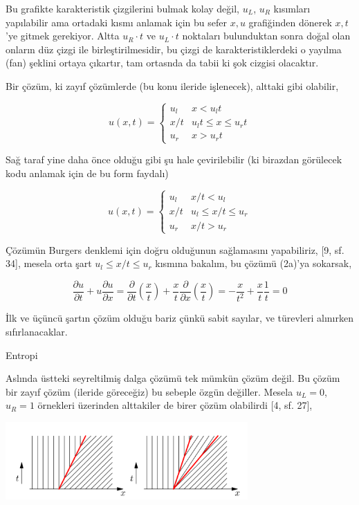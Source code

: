 \documentclass[12pt,fleqn]{article}\usepackage{../../common}
\begin{document}
Bu grafikte karakteristik çizgilerini bulmak kolay değil, $u_L$, $u_R$ kısımları
yapılabilir ama ortadaki kısmı anlamak için bu sefer $x,u$ grafiğinden dönerek
$x,t$'ye gitmek gerekiyor. Altta $u_R \cdot t$ ve $u_L \cdot t$ noktaları
bulunduktan sonra doğal olan onların düz çizgi ile birleştirilmesidir, bu çizgi
de karakteristiklerdeki o yayılma (fan) şeklini ortaya çıkartır, tam ortasnda da
tabii ki şok cizgisi olacaktır. 

Bir çözüm, ki zayıf çözümlerde (bu konu ileride işlenecek), alttaki gibi olabilir,

$$
u(x,t) =
\left\{ \begin{array}{ll}
u_l & x < u_l t  \\
x/t & u_l t \le x \le u_r t \\
u_r & x > u_r t
\end{array} \right.
$$

Sağ taraf yine daha önce olduğu gibi şu hale çevirilebilir (ki birazdan
görülecek kodu anlamak için de bu form faydalı)

$$
u(x,t) =
\left\{ \begin{array}{ll}
u_l & x/t < u_l \\
x/t & u_l \le x/t \le u_r  \\
u_r & x/t > u_r 
\end{array} \right. 
$$

Çözümün Burgers denklemi için doğru olduğunun sağlamasını yapabiliriz, 
[9, sf. 34], mesela orta şart $u_l \le x/t \le u_r $ kısmına bakalım,
bu çözümü (2a)'ya sokarsak,

$$
\frac{\partial u}{\partial t} + u \frac{\partial u}{\partial x} =
\frac{\partial }{\partial t} \left( \frac{x}{t}  \right) +
\frac{x}{t} \frac{\partial }{\partial x} \left( \frac{x}{t}  \right) =
-\frac{x}{t^2} + \frac{x}{t} \frac{1}{t} = 0
$$

İlk ve üçüncü şartın çözüm olduğu bariz çünkü sabit sayılar, ve türevleri
alınırken sıfırlanacaklar.

Entropi

Aslında üstteki seyreltilmiş dalga çözümü tek mümkün çözüm değil. Bu çözüm bir
zayıf çözüm (ileride göreceğiz) bu sebeple özgün değiller. Mesela $u_L = 0$,
$u_R = 1$ örnekleri üzerinden alttakiler de birer çözüm olabilirdi [4, sf. 27],

\includegraphics[width=25em]{compscieng_bpp50fv1_07.png}
\end{document}
